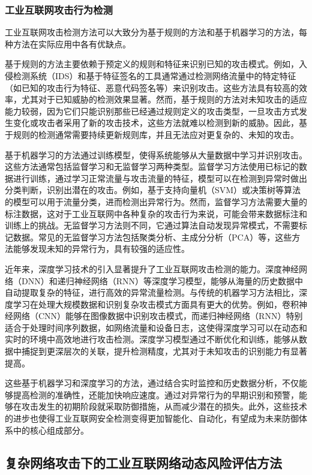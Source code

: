\subsubsection{工业互联网攻击行为检测}

工业互联网攻击检测方法可以大致分为基于规则的方法和基于机器学习的方法，每种方法在实际应用中各有优缺点。

基于规则的方法主要依赖于预定义的规则和特征来识别已知的攻击模式。例如，入侵检测系统（IDS）和基于特征签名的工具通常通过检测网络流量中的特定特征（如已知的攻击行为特征、恶意代码签名等）来识别攻击。这些方法具有较高的效率，尤其对于已知威胁的检测效果显著。然而，基于规则的方法对未知攻击的适应能力较弱，因为它们只能识别那些已经通过规则定义的攻击类型，一旦攻击方式发生变化或攻击者采用了新的攻击技术，这些方法就难以检测到新的威胁。因此，基于规则的检测通常需要持续更新规则库，并且无法应对更复杂的、未知的攻击。

基于机器学习的方法通过训练模型，使得系统能够从大量数据中学习并识别攻击。这些方法通常包括监督学习和无监督学习两种类型。监督学习方法使用已标记的数据进行训练，通过学习正常流量与攻击流量的特征，模型可以在检测到异常时做出分类判断，识别出潜在的攻击。例如，基于支持向量机（SVM）或决策树等算法的模型可以用于流量分类，进而检测出异常行为。然而，监督学习方法需要大量的标注数据，这对于工业互联网中各种复杂的攻击行为来说，可能会带来数据标注和训练上的挑战。无监督学习方法则不同，它通过算法自动发现异常模式，不需要标记数据。常见的无监督学习方法包括聚类分析、主成分分析（PCA）等，这些方法能够发现未知的异常行为，具有较强的适应性。

近年来，深度学习技术的引入显著提升了工业互联网攻击检测的能力。深度神经网络（DNN）和递归神经网络（RNN）等深度学习模型，能够从海量的历史数据中自动提取复杂的特征，进行高效的异常流量检测。与传统的机器学习方法相比，深度学习在处理大规模数据和识别复杂攻击模式方面具有更大的优势。例如，卷积神经网络（CNN）能够在图像数据中识别攻击模式，而递归神经网络（RNN）特别适合于处理时间序列数据，如网络流量和设备日志，这使得深度学习可以在动态和实时的环境中高效地进行攻击检测。深度学习模型通过不断优化和训练，能够从数据中捕捉到更深层次的关联，提升检测精度，尤其对于未知攻击的识别能力有显著提高。

这些基于机器学习和深度学习的方法，通过结合实时监控和历史数据分析，不仅能够提高检测的准确性，还能加快响应速度。通过对异常行为的早期识别和预警，能够在攻击发生的初期阶段就采取防御措施，从而减少潜在的损失。此外，这些技术的进步也使得工业互联网安全检测变得更加智能化、自动化，有望成为未来防御体系中的核心组成部分。

\subsection{复杂网络攻击下的工业互联网络动态风险评估方法}

